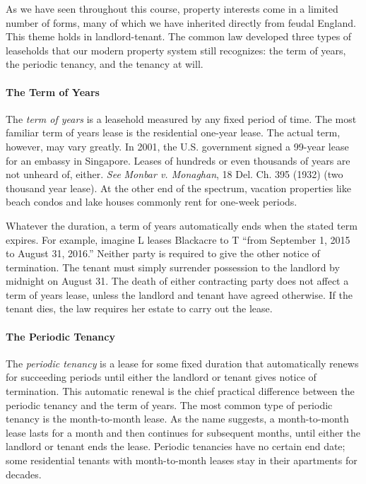 As we have seen throughout this course, property interests come in a limited
number of forms, many of which we have inherited directly from feudal England. 
This theme holds in landlord-tenant.  The common law developed three types of
leaseholds that our modern property system still recognizes: the term of years,
the periodic tenancy, and the tenancy at will.

\paragraph{The Term of Years}

The \textit{term of years} is a leasehold measured by any fixed period of time. 
The most familiar term of years lease is the residential one-year lease. The
actual term, however, may vary greatly.  In 2001, the U.S. government signed a
99-year lease for an embassy in Singapore.  Leases of hundreds or even
thousands of years are not unheard of, either.  \textit{See} \emph{Monbar v.
Monaghan}, 18 Del. Ch. 395 (1932) (two thousand year lease).  At the other end
of the spectrum, vacation properties like beach condos and lake houses commonly
rent for one-week periods. 

Whatever the duration, a term of years automatically ends when the stated term
expires.  For example, imagine L leases Blackacre to T ``from September 1, 2015
to August 31, 2016.''  Neither party is required to give the other notice of
termination.  The tenant must simply surrender possession to the landlord by
midnight on August 31.  The death of either contracting party does not affect a
term of years lease, unless the landlord and tenant have agreed otherwise.  If
the tenant dies, the law requires her estate to carry out the lease. 

\paragraph{The Periodic Tenancy}

The \textit{periodic tenancy} is a lease for some fixed duration that
automatically renews for succeeding periods until either the landlord or tenant
gives notice of termination.  This automatic renewal is the chief practical
difference between the periodic tenancy and the term of years.  The most common
type of periodic tenancy is the month-to-month lease.  As the name suggests, a
month-to-month lease lasts for a month and then continues for subsequent
months, until either the landlord or tenant ends the lease.  Periodic tenancies
have no certain end date; some residential tenants with month-to-month leases
stay in their apartments for decades.  

